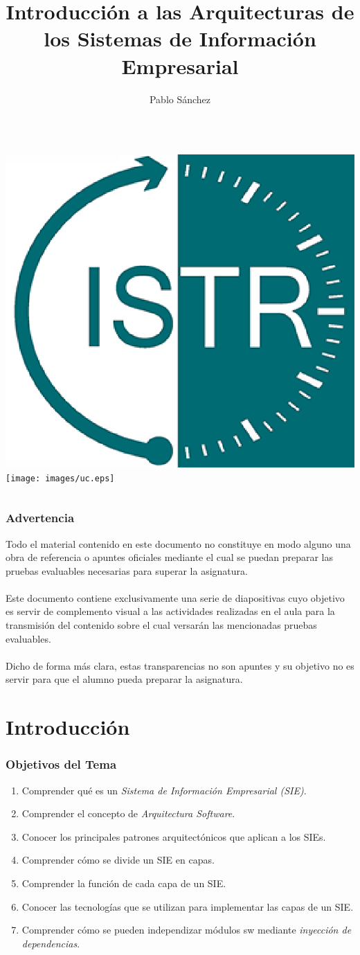 \documentclass[handout,a4paper,t,xcolor=pst,dvips,colortheme]{beamer}
\title[Arquitecturas SIE]{Introducción a las Arquitecturas de los Sistemas de Información Empresarial}
\author[Pablo Sánchez]{\alert{Pablo Sánchez}}
\institute[IIE]{
		   Dpto. Ingeniería Informática y Electrónica \\
		   Universidad de Cantabria \\
		   Santander (Cantabria, España) \\
		   \texttt{p.sanchez@unican.es}
}
\date{}
\begin{document}
\begin{frame}[c]
	\titlepage
	\begin{columns}
			\centering
    		\includegraphics[width=.28\textwidth,keepaspectratio=true]{images/istr.eps}
			\centering
			\texttt{[image: images/uc.eps]}
	\end{columns}
\end{frame}

\begin{frame}[c]
    \frametitle{\alert{Advertencia}}
    \begin{center}
        Todo el material contenido en este documento no constituye en modo alguno una obra de referencia o apuntes oficiales mediante el cual se puedan preparar las pruebas evaluables necesarias para superar la asignatura. \ \\
        \ \\
        Este documento contiene exclusivamente una serie de diapositivas cuyo objetivo es servir de complemento visual a las actividades realizadas en el aula para la transmisión del contenido sobre el cual versarán las mencionadas pruebas evaluables.  \ \\
        \ \\
        Dicho de forma más clara, \alert{estas transparencias no son apuntes y su objetivo no es servir para que el alumno pueda preparar la asignatura.}
    \end{center}
\end{frame}

\section{Introducción}

\begin{frame}[c]
    \frametitle{Objetivos del Tema}
    \begin{enumerate}[<+->]
         \item Comprender qué es un \emph{Sistema de Información Empresarial (SIE)}.
         \item Comprender el concepto de \emph{Arquitectura Software}.
         \item Conocer los principales patrones arquitectónicos que aplican a los SIEs.
         \item Comprender cómo se divide un SIE en capas.
         \item Comprender la función de cada capa de un SIE.
         \item Conocer las tecnologías que se utilizan para implementar las capas de un SIE.
         \item Comprender cómo se pueden independizar módulos sw mediante \emph{inyección de dependencias}.
    \end{enumerate}
\end{frame}
\end{document}
